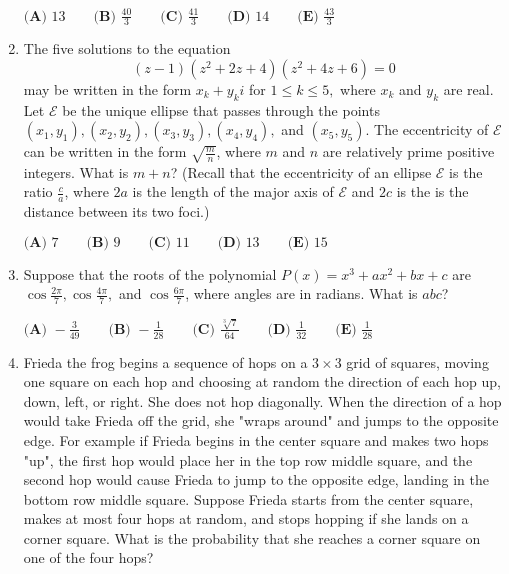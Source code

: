 \documentclass{article}
\begin{document}
\begin{enumerate}[label=\arabic*., itemsep=0.5em]
$\textbf{(A) }13 \qquad \textbf{(B) }\frac{40}3 \qquad \textbf{(C) }\frac{41}3 \qquad \textbf{(D) }14\qquad \textbf{(E) }\frac{43}3$\par \vspace{0.5em}\item The five solutions to the equation
\begin{equation*}
(z-1)(z^2+2z+4)(z^2+4z+6)=0
\end{equation*}
 may be written in the form $x_k+y_ki$ for $1\le k\le 5,$ where $x_k$ and $y_k$ are real. Let $\mathcal E$ be the unique ellipse that passes through the points $(x_1,y_1),(x_2,y_2),(x_3,y_3),(x_4,y_4),$ and $(x_5,y_5)$. The eccentricity of $\mathcal E$ can be written in the form $\sqrt{\frac mn}$, where $m$ and $n$ are relatively prime positive integers. What is $m+n$? (Recall that the eccentricity of an ellipse $\mathcal E$ is the ratio $\frac ca$, where $2a$ is the length of the major axis of $\mathcal E$ and $2c$ is the is the distance between its two foci.)

$\textbf{(A) }7 \qquad \textbf{(B) }9 \qquad \textbf{(C) }11 \qquad \textbf{(D) }13\qquad \textbf{(E) }15$\par \vspace{0.5em}\item Suppose that the roots of the polynomial $P(x)=x^3+ax^2+bx+c$ are $\cos \frac{2\pi}7,\cos \frac{4\pi}7,$ and $\cos \frac{6\pi}7$, where angles are in radians. What is $abc$?

$\textbf{(A) }{-}\frac{3}{49} \qquad \textbf{(B) }{-}\frac{1}{28} \qquad \textbf{(C) }\frac{\sqrt[3]7}{64} \qquad \textbf{(D) }\frac{1}{32}\qquad \textbf{(E) }\frac{1}{28}$\par \vspace{0.5em}\item Frieda the frog begins a sequence of hops on a $3\times3$ grid of squares, moving one square on each hop and choosing at random the direction of each hop up, down, left, or right. She does not hop diagonally. When the direction of a hop would take Frieda off the grid, she "wraps around" and jumps to the opposite edge. For example if Frieda begins in the center square and makes two hops "up", the first hop would place her in the top row middle square, and the second hop would cause Frieda to jump to the opposite edge, landing in the bottom row middle square. Suppose Frieda starts from the center square, makes at most four hops at random, and stops hopping if she lands on a corner square. What is the probability that she reaches a corner square on one of the four hops?


\end{enumerate}
\end{document}
